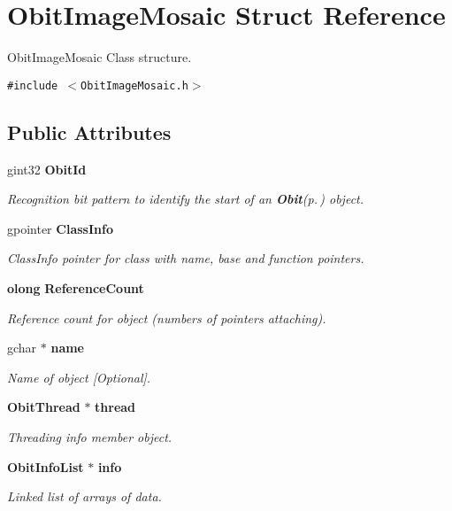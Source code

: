 \section{Obit\-Image\-Mosaic Struct Reference}
\label{structObitImageMosaic}
Obit\-Image\-Mosaic Class structure.  


{\tt \#include $<$Obit\-Image\-Mosaic.h$>$}

\subsection*{Public Attributes}
\begin{CompactItemize}
\item 
gint32 {\bf Obit\-Id}
\begin{CompactList}\small\item\em Recognition bit pattern to identify the start of an {\bf Obit}{\rm (p.\,\pageref{structObit})} object. \item\end{CompactList}\item 
gpointer {\bf Class\-Info}
\begin{CompactList}\small\item\em Class\-Info pointer for class with name, base and function pointers. \item\end{CompactList}\item 
{\bf olong} {\bf Reference\-Count}
\begin{CompactList}\small\item\em Reference count for object (numbers of pointers attaching). \item\end{CompactList}\item 
gchar $\ast$ {\bf name}
\begin{CompactList}\small\item\em Name of object [Optional]. \item\end{CompactList}\item 
{\bf Obit\-Thread} $\ast$ {\bf thread}
\begin{CompactList}\small\item\em Threading info member object. \item\end{CompactList}\item 
{\bf Obit\-Info\-List} $\ast$ {\bf info}
\begin{CompactList}\small\item\em Linked list of arrays of data. \item\end{CompactList}\item 

\end{CompactItemize}
